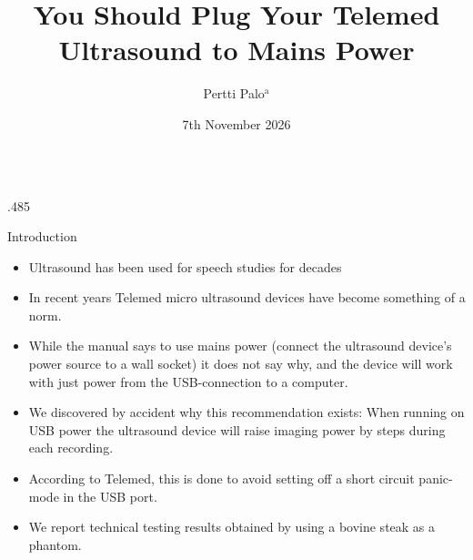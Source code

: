 \documentclass[final,hyperref={pdfpagelabels=false}]{beamer}
\title{\huge You Should Plug Your Telemed Ultrasound to Mains Power}
\author{Pertti Palo$^{\mathrm{a}}$}
\institute{Communication Sciences and Disorders, and Linguistics; University of Alberta}
\date{7th November 2026}
\begin{document}
\begin{frame}{} 
  \vspace{-1cm}
  \begin{columns}[t]
    \begin{column}{.485\linewidth}
      
      \begin{block}{Introduction}

        \begin{itemize}
          \item Ultrasound has been used for speech studies for decades
            \citep{ShawkerSonies-UltrasoundBiofeedbackSpeech-1985,Gick-UseUltrasoundLinguistic-2002,Stone-GuideAnalyzingTongue-2005}
          \item In recent years Telemed micro ultrasound devices have become
            something of a norm. 
          \item While the manual says to use mains power (connect the
            ultrasound device's power source to a wall socket) it does not say
            why, and the device will work with just power from the
            USB-connection to a computer.
          \item We discovered by accident why this recommendation exists: When running on USB
          power the ultrasound device will raise imaging power by steps during each
          recording. 
          \item According to Telemed, this is done to avoid setting off a short
          circuit panic-mode in the USB port.
          \item We report technical testing results obtained by using a bovine steak as a phantom. 
        \end{itemize}
      \end{block}
    \end{column}
      

\end{columns}
\end{frame}
\end{document}
